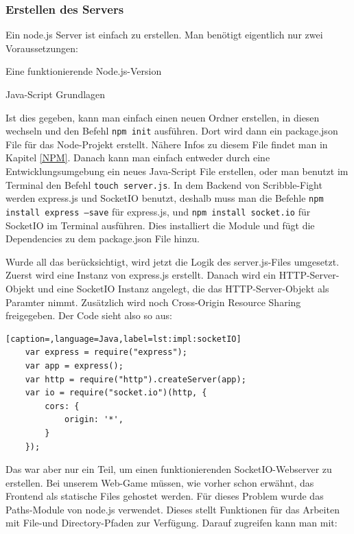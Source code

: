 \subsubsection{Erstellen des Servers}
Ein node.js Server ist einfach zu erstellen. Man benötigt eigentlich nur zwei Voraussetzungen:

\begin{compactitem}
    \item {Eine funktionierende Node.js-Version}
    \item Java-Script Grundlagen
\end{compactitem}

Ist dies gegeben, kann man einfach einen neuen Ordner erstellen, in diesen wechseln und den Befehl \texttt{npm init} ausführen. 
Dort wird dann ein package.json File für das Node-Projekt erstellt. Nähere Infos zu diesem File findet man in Kapitel \ref{NPM}.
Danach kann man einfach entweder durch eine Entwicklungsumgebung ein neues Java-Script File erstellen, oder man benutzt im Terminal den Befehl \texttt{touch server.js}.
In dem Backend von Scribble-Fight werden express.js und SocketIO benutzt, deshalb muss man die Befehle \texttt{npm install express --save} für express.js, und
\texttt{npm install socket.io} für SocketIO im Terminal ausführen. Dies installiert die Module und fügt die Dependencies zu dem package.json File hinzu. 

Wurde all das berücksichtigt, wird jetzt die Logik des server.js-Files umgesetzt. Zuerst wird eine Instanz von express.js erstellt. 
Danach wird ein HTTP-Server-Objekt und eine SocketIO Instanz angelegt, die das HTTP-Server-Objekt als Paramter nimmt. Zusätzlich wird noch Cross-Origin Resource Sharing freigegeben. 
Der Code sieht also so aus: 

\begin{lstlisting}[caption=,language=Java,label=lst:impl:socketIO]
    var express = require("express");
    var app = express();
    var http = require("http").createServer(app);
    var io = require("socket.io")(http, {
        cors: {
            origin: '*',
        }
    });
\end{lstlisting}

Das war aber nur ein Teil, um einen funktionierenden SocketIO-Webserver zu erstellen. Bei unserem Web-Game müssen, wie vorher schon erwähnt, das Frontend als statische Files gehostet werden.
Für dieses Problem wurde das Paths-Module von node.js verwendet. Dieses stellt Funktionen für das Arbeiten mit File-und Directory-Pfaden zur Verfügung. Darauf zugreifen kann  man mit:

